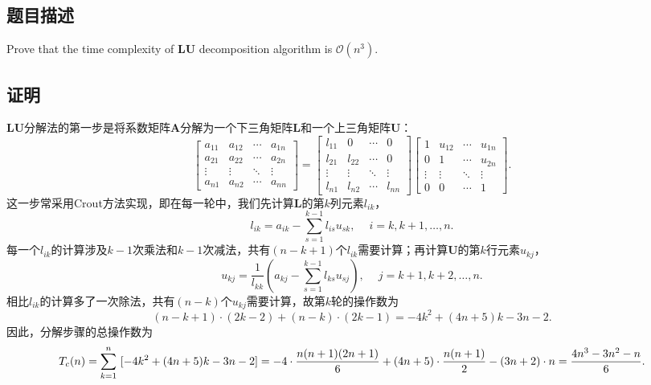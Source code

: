 \subsection{题目描述}
Prove that the time complexity of $\bm{LU}$ decomposition algorithm is $\mathcal{O}(n^3)$.
\subsection{证明}
$\bm{LU}$分解法的第一步是将系数矩阵$\bm{A}$分解为一个下三角矩阵$\bm{L}$和一个上三角矩阵$\bm{U}$：
\[
    \begin{bmatrix}
        a_{11} & a_{12} & \cdots & a_{1n} \\
        a_{21} & a_{22} & \cdots & a_{2n} \\
        \vdots & \vdots & \ddots & \vdots \\
        a_{n1} & a_{n2} & \cdots & a_{nn}
    \end{bmatrix}
    =
    \begin{bmatrix}
        l_{11} & 0      & \cdots & 0      \\
        l_{21} & l_{22} & \cdots & 0      \\
        \vdots & \vdots & \ddots & \vdots \\
        l_{n1} & l_{n2} & \cdots & l_{nn}
    \end{bmatrix}
    \begin{bmatrix}
        1      & u_{12} & \cdots & u_{1n} \\
        0      & 1      & \cdots & u_{2n} \\
        \vdots & \vdots & \ddots & \vdots \\
        0      & 0      & \cdots & 1
    \end{bmatrix}.
\]
这一步常采用Crout方法实现，即在每一轮中，我们先计算$\bm{L}$的第$k$列元素$l_{ik}$，
\[
    l_{ik} = a_{ik} - \sum_{s=1}^{k-1} l_{is} u_{sk}, \quad \ i = k, k+1, \dots, n.
\]
每一个$l_{ik}$的计算涉及$k-1$次乘法和$k-1$次减法，共有$(n-k+1)$个$l_{ik}$需要计算；再计算$\bm{U}$的第$k$行元素$u_{kj}$，
\[
    u_{kj} = \frac{1}{l_{kk}} \left( a_{kj} - \sum_{s=1}^{k-1} l_{ks} u_{sj} \right), \quad \ j = k+1, k+2, \dots, n.
\]
相比$l_{ik}$的计算多了一次除法，共有$(n-k)$个$u_{kj}$需要计算，故第$k$轮的操作数为
\[
    (n-k+1)\cdot(2k-2)+(n-k)\cdot(2k-1) = -4k^2 + (4n+5)k -3n -2.
\]
因此，分解步骤的总操作数为
\[
    T_c(n) =\sum_{k=1}^{n} \ [-4k^2 + (4n+5)k -3n -2]                                                 \\
    = -4 \cdot \frac{n(n+1)(2n+1)}{6} + (4n+5) \cdot \frac{n(n+1)}{2} - (3n+2) \cdot n\\
    = \frac{4n^3 - 3n^2 - n}{6}.
\]

